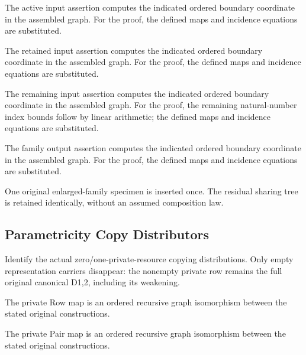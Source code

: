 The active input assertion computes the indicated ordered boundary coordinate in the assembled graph.
For the proof, the defined maps and incidence equations are substituted.
\par{}

The retained input assertion computes the indicated ordered boundary coordinate in the assembled graph.
For the proof, the defined maps and incidence equations are substituted.
\par{}

The remaining input assertion computes the indicated ordered boundary coordinate in the assembled graph.
For the proof, the remaining natural-number index bounds follow by linear arithmetic; the defined maps and incidence equations are substituted.
\par{}

The family output assertion computes the indicated ordered boundary coordinate in the assembled graph.
For the proof, the defined maps and incidence equations are substituted.
\par{}

One original enlarged-family specimen is inserted once. The residual sharing tree is retained identically, without an assumed composition law.
\par{}

\subsection{Parametricity Copy Distributors}
Identify the actual zero/one-private-resource copying distributions. Only empty representation carriers disappear: the nonempty private row remains the full original canonical D1,2, including its weakening.

The private Row map is an ordered recursive graph isomorphism between the stated original constructions.
\par{}

The private Pair map is an ordered recursive graph isomorphism between the stated original constructions.
\par{}

